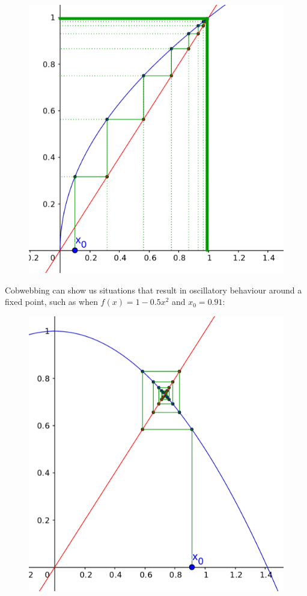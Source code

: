 \documentclass[11pt]{article}
\makeatletter
\def\maxwidth{\ifdim\Gin@nat@width>\linewidth\linewidth
    \else\Gin@nat@width\fi}
\let\Oldincludegraphics\includegraphics
\renewcommand{\includegraphics}[1]{\Oldincludegraphics[width=.8\maxwidth]{#1}}
\makeatother
\begin{document}
\begin{figure}[htbp]
\centering
\includegraphics{cobweb2.png}
\caption{}
\end{figure}

Cobwebbing can show us situations that result in oscillatory behaviour
around a fixed point, such as when \(f(x) = 1-0.5x^2\) and
\(x_0 = 0.91\):

\begin{figure}[htbp]
\centering
\includegraphics{cobweb3.png}
\caption{}
\end{figure}
\end{document}
